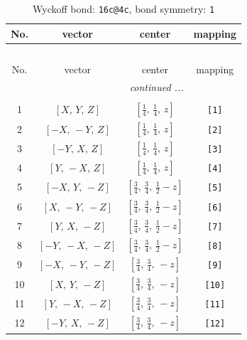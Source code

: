 \documentclass[fleqn,8pt]{jsarticle}
\begin{document}
\begin{longtable}{cccc}
\caption{Wyckoff bond: {\tt 16c@4c}, bond symmetry: {\tt 1}}
 \\
 \hline \hline
No. & vector & center & mapping \\ \hline \endfirsthead

\multicolumn{3}{l}{\tablename\ \thetable{}} \\
 \hline \hline
No. & vector & center & mapping \\ \hline \endhead

 \hline \hline
\multicolumn{3}{r}{\footnotesize\it continued ...} \\ \endfoot

 \hline \hline
\multicolumn{3}{r}{} \\ \endlastfoot

1 & $\left[ X,\, Y,\, Z \right]$ & $\left[ \frac{1}{4},\, \frac{1}{4},\, z \right]$ & {\tt [1]} \\ \hline
2 & $\left[ - X,\, - Y,\, Z \right]$ & $\left[ \frac{1}{4},\, \frac{1}{4},\, z \right]$ & {\tt [2]} \\ \hline
3 & $\left[ - Y,\, X,\, Z \right]$ & $\left[ \frac{1}{4},\, \frac{1}{4},\, z \right]$ & {\tt [3]} \\ \hline
4 & $\left[ Y,\, - X,\, Z \right]$ & $\left[ \frac{1}{4},\, \frac{1}{4},\, z \right]$ & {\tt [4]} \\ \hline
5 & $\left[ - X,\, Y,\, - Z \right]$ & $\left[ \frac{3}{4},\, \frac{3}{4},\, \frac{1}{2} - z \right]$ & {\tt [5]} \\ \hline
6 & $\left[ X,\, - Y,\, - Z \right]$ & $\left[ \frac{3}{4},\, \frac{3}{4},\, \frac{1}{2} - z \right]$ & {\tt [6]} \\ \hline
7 & $\left[ Y,\, X,\, - Z \right]$ & $\left[ \frac{3}{4},\, \frac{3}{4},\, \frac{1}{2} - z \right]$ & {\tt [7]} \\ \hline
8 & $\left[ - Y,\, - X,\, - Z \right]$ & $\left[ \frac{3}{4},\, \frac{3}{4},\, \frac{1}{2} - z \right]$ & {\tt [8]} \\ \hline
9 & $\left[ - X,\, - Y,\, - Z \right]$ & $\left[ \frac{3}{4},\, \frac{3}{4},\, - z \right]$ & {\tt [9]} \\ \hline
10 & $\left[ X,\, Y,\, - Z \right]$ & $\left[ \frac{3}{4},\, \frac{3}{4},\, - z \right]$ & {\tt [10]} \\ \hline
11 & $\left[ Y,\, - X,\, - Z \right]$ & $\left[ \frac{3}{4},\, \frac{3}{4},\, - z \right]$ & {\tt [11]} \\ \hline
12 & $\left[ - Y,\, X,\, - Z \right]$ & $\left[ \frac{3}{4},\, \frac{3}{4},\, - z \right]$ & {\tt [12]} \\ \hline

\end{longtable}
\end{document}
